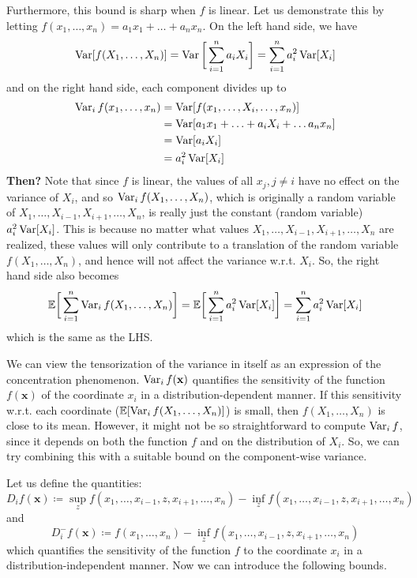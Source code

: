   Furthermore, this bound is sharp when $f$ is linear. Let us demonstrate this by letting $f(x_1, \ldots, x_n) = a_1 x_1 + \ldots + a_n x_n$. On the left hand side, we have 
  \begin{equation}
    \operatorname{Var}[ f(X_1, \ldots, X_n)] = \operatorname{Var}\bigg[ \sum_{i=1}^n a_i X_i \bigg] = \sum_{i=1}^n a_i^2 \operatorname{Var}[X_i]
  \end{equation}
  and on the right hand side, each component divides up to 
  \begin{align*}
      \operatorname{Var}_i f(x_1, \ldots, x_n ) & = \operatorname{Var}[ f(x_1, \ldots, X_i, \ldots, x_n)] \\
      & = \operatorname{Var}[ a_1 x_1 + \ldots + a_i X_i + \ldots a_n x_n] \\
      & = \operatorname{Var}[a_i X_i] \\
      & = a_i^2 \operatorname{Var}[X_i]
  \end{align*}
  \textbf{Then?} Note that since $f$ is linear, the values of all $x_j, j \neq i$ have no effect on the variance of $X_i$, and so $\operatorname{Var}_i f(X_1, \ldots, X_n)$, which is originally a random variable of $X_1, \ldots, X_{i-1}, X_{i+1}, \ldots, X_n$, is really just the constant (random variable) $a_i^2 \operatorname{Var}[X_i]$. This is because no matter what values $X_1, \ldots, X_{i-1}, X_{i+1}, \ldots, X_n$ are realized, these values will only contribute to a translation of the random variable $f(X_1, \ldots, X_n)$, and hence will not affect the variance w.r.t. $X_i$. So, the right hand side also becomes 
  \begin{equation}
    \mathbb{E} \bigg[ \sum_{i=1}^n \operatorname{Var}_i f(X_1, \ldots, X_n) \bigg] = \mathbb{E} \bigg[ \sum_{i=1}^n a_i^2 \operatorname{Var}[X_i] \bigg] = \sum_{i=1}^n a_i^2 \operatorname{Var}[X_i]
  \end{equation}
  which is the same as the LHS. 

  We can view the tensorization of the variance in itself as an expression of the concentration phenomenon. $\operatorname{Var}_i f (\mathbf{x})$ quantifies the sensitivity of the function $f(\mathbf{x})$ of the coordinate $x_i$ in a distribution-dependent manner. If this sensitivity w.r.t. each coordinate ($\mathbb{E}[ \operatorname{Var}_i f(X_1, \ldots, X_n)]$) is small, then $f(X_1, \ldots, X_n)$ is close to its mean. However, it might not be so straightforward to compute $\operatorname{Var}_i f$, since it depends on both the function $f$ and on the distribution of $X_i$. So, we can try combining this with a suitable bound on the component-wise variance. 

  Let us define the quantities: 
  \begin{equation}
    D_i f (\mathbf{x}) \coloneqq \sup_z f(x_1, \ldots, x_{i-1}, z, x_{i+1}, \ldots, x_n) - \inf_z f(x_1, \ldots, x_{i-1}, z, x_{i+1}, \ldots, x_n)
  \end{equation}
  and 
  \begin{equation}
    D_i^- f(\mathbf{x}) \coloneqq f(x_1, \ldots, x_n) - \inf_z f(x_1, \ldots, x_{i-1}, z, x_{i+1}, \ldots, x_n)
  \end{equation}
  which quantifies the sensitivity of the function $f$ to the coordinate $x_i$ in a distribution-independent manner. Now we can introduce the following bounds. 

